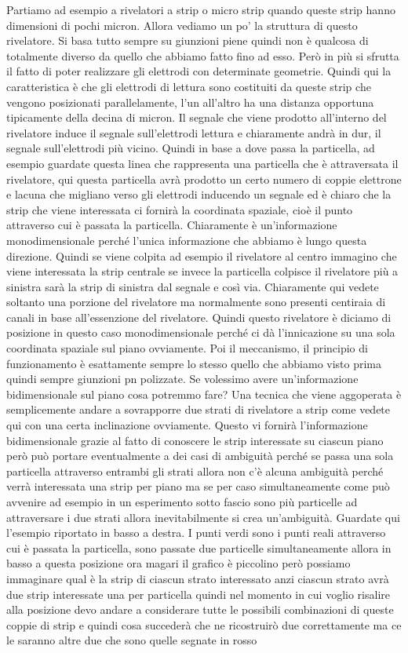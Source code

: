 Partiamo ad esempio a rivelatori a strip o micro strip quando queste strip hanno dimensioni di pochi micron. Allora vediamo un po' la struttura di questo rivelatore. Si basa tutto sempre su giunzioni piene quindi non è qualcosa di totalmente diverso da quello che abbiamo fatto fino ad esso. Però in più si sfrutta il fatto di poter realizzare gli elettrodi con determinate geometrie. Quindi qui la caratteristica è che gli elettrodi di lettura sono costituiti da queste strip che vengono posizionati parallelamente, l'un all'altro ha una distanza opportuna tipicamente della decina di micron. Il segnale che viene prodotto all'interno del rivelatore induce il segnale sull'elettrodi lettura e chiaramente andrà in dur, il segnale sull'elettrodi più vicino. Quindi in base a dove passa la particella, ad esempio guardate questa linea che rappresenta una particella che è attraversata il rivelatore, qui questa particella avrà prodotto un certo numero di coppie elettrone e lacuna che migliano verso gli elettrodi inducendo un segnale ed è chiaro che la strip che viene interessata ci fornirà la coordinata spaziale, cioè il punto attraverso cui è passata la particella. Chiaramente è un'informazione monodimensionale perché l'unica informazione che abbiamo è lungo questa direzione. Quindi se viene colpita ad esempio il rivelatore al centro immagino che viene interessata la strip centrale se invece la particella colpisce il rivelatore più a sinistra sarà la strip di sinistra dal segnale e così via. Chiaramente qui vedete soltanto una porzione del rivelatore ma normalmente sono presenti centiraia di canali in base all'essenzione del rivelatore. Quindi questo rivelatore è diciamo di posizione in questo caso monodimensionale perché ci dà l'innicazione su una sola coordinata spaziale sul piano ovviamente. Poi il meccanismo, il principio di funzionamento è esattamente sempre lo stesso quello che abbiamo visto prima quindi sempre giunzioni pn polizzate. Se volessimo avere un'informazione bidimensionale sul piano cosa potremmo fare? Una tecnica che viene aggoperata è semplicemente andare a sovrapporre due strati di rivelatore a strip come vedete qui con una certa inclinazione ovviamente. Questo vi fornirà l'informazione bidimensionale grazie al fatto di conoscere le strip interessate su ciascun piano però può portare eventualmente a dei casi di ambiguità perché se passa una sola particella attraverso entrambi gli strati allora non c'è alcuna ambiguità perché verrà interessata una strip per piano ma se per caso simultaneamente come può avvenire ad esempio in un esperimento sotto fascio sono più particelle ad attraversare i due strati allora inevitabilmente si crea un'ambiguità. Guardate qui l'esempio riportato in basso a destra. I punti verdi sono i punti reali attraverso cui è passata la particella, sono passate due particelle simultaneamente allora in basso a questa posizione ora magari il grafico è piccolino però possiamo immaginare qual è la strip di ciascun strato interessato anzi ciascun strato avrà due strip interessate una per particella quindi nel momento in cui voglio risalire alla posizione devo andare a considerare tutte le possibili combinazioni di queste coppie di strip e quindi cosa succederà che ne ricostruirò due correttamente ma ce le saranno altre due che sono quelle segnate in rosso 